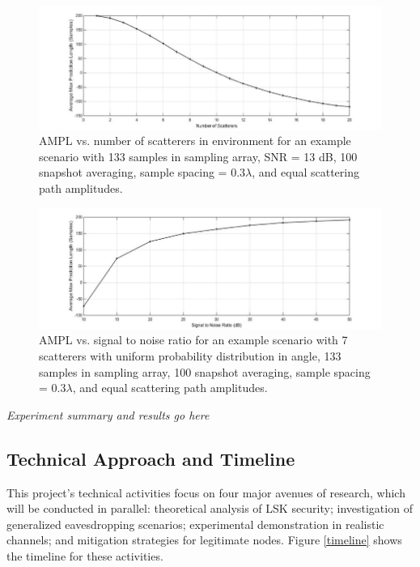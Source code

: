 \documentclass[12pt, titlepage]{article}
\begin{document}
\begin{figure}
\begin{center}
\includegraphics[width=\textwidth]{sim_vs_numScat}
\caption{AMPL vs. number of scatterers in environment for an example scenario with 133 samples in sampling array, SNR = 13 dB, 100 snapshot averaging, sample spacing = $0.3 \lambda$, and equal scattering path amplitudes.}\label{sim_vs_numScat}
\end{center}
\end{figure}
\begin{figure}
\begin{center}
\includegraphics[width=\textwidth]{sim_vs_SNR}
\caption{AMPL vs. signal to noise ratio for an example scenario with 7 scatterers with uniform probability distribution in angle, 133 samples in sampling array, 100 snapshot averaging, sample spacing = $0.3 \lambda$, and equal scattering path amplitudes.}\label{sim_vs_SNR}
\end{center}
\end{figure}


\emph{Experiment summary and results go here}


\newpage
\subsection*{Technical Approach and Timeline}
This project's technical activities focus on four major avenues of research, which will be conducted in parallel: theoretical analysis of LSK security; investigation of generalized eavesdropping scenarios; experimental demonstration in realistic channels; and mitigation strategies for legitimate nodes.  Figure \ref{timeline} shows the timeline for these activities. 
\end{document}
